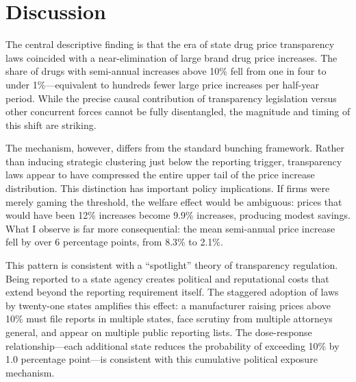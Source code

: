 \documentclass[12pt]{article}
\begin{document}
\section{Discussion}

The central descriptive finding is that the era of state drug price transparency laws coincided with a near-elimination of large brand drug price increases. The share of drugs with semi-annual increases above 10\% fell from one in four to under 1\%---equivalent to hundreds fewer large price increases per half-year period. While the precise causal contribution of transparency legislation versus other concurrent forces cannot be fully disentangled, the magnitude and timing of this shift are striking.

The mechanism, however, differs from the standard bunching framework. Rather than inducing strategic clustering just below the reporting trigger, transparency laws appear to have compressed the entire upper tail of the price increase distribution. This distinction has important policy implications. If firms were merely gaming the threshold, the welfare effect would be ambiguous: prices that would have been 12\% increases become 9.9\% increases, producing modest savings. What I observe is far more consequential: the mean semi-annual price increase fell by over 6 percentage points, from 8.3\% to 2.1\%.

This pattern is consistent with a ``spotlight'' theory of transparency regulation. Being reported to a state agency creates political and reputational costs that extend beyond the reporting requirement itself. The staggered adoption of laws by twenty-one states amplifies this effect: a manufacturer raising prices above 10\% must file reports in multiple states, face scrutiny from multiple attorneys general, and appear on multiple public reporting lists. The dose-response relationship---each additional state reduces the probability of exceeding 10\% by 1.0 percentage point---is consistent with this cumulative political exposure mechanism.
\end{document}
